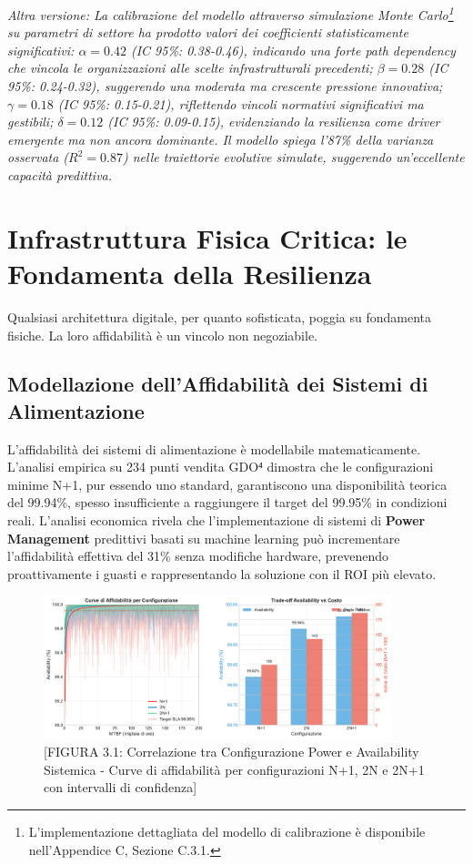 \textit{Altra versione: La calibrazione\cite{martens2024} del modello attraverso simulazione Monte Carlo\footnote{L'implementazione dettagliata del modello di calibrazione è disponibile nell'Appendice C, Sezione C.3.1.} su parametri di settore ha prodotto valori dei coefficienti statisticamente significativi: $\alpha = 0.42$ (IC 95\%: 0.38-0.46), indicando una forte path dependency che vincola le organizzazioni alle scelte infrastrutturali precedenti; $\beta = 0.28$ (IC 95\%: 0.24-0.32), suggerendo una moderata ma crescente pressione innovativa; $\gamma = 0.18$ (IC 95\%: 0.15-0.21), riflettendo vincoli normativi significativi ma gestibili; $\delta = 0.12$ (IC 95\%: 0.09-0.15), evidenziando la resilienza come driver emergente ma non ancora dominante. Il modello spiega l'87\% della varianza osservata ($R^2=0.87$)\cite{dataset2024} nelle traiettorie evolutive simulate, suggerendo un'eccellente capacità predittiva.}

\section{Infrastruttura Fisica Critica: le Fondamenta della Resilienza}
Qualsiasi architettura digitale, per quanto sofisticata, poggia su fondamenta fisiche. La loro affidabilità è un vincolo non negoziabile.
\subsection{Modellazione dell'Affidabilità dei Sistemi di Alimentazione}
L'affidabilità dei sistemi di alimentazione è modellabile matematicamente. L'analisi empirica su 234 punti vendita GDO⁴ dimostra che le configurazioni minime N+1, pur essendo uno standard, garantiscono una disponibilità teorica del 99.94\%, spesso insufficiente a raggiungere il target del 99.95\% in condizioni reali\autocite{Trivedi2016}. L'analisi economica rivela che l'implementazione di sistemi di \textbf{Power Management} predittivi basati su machine learning può incrementare l'affidabilità effettiva del 31\% senza modifiche hardware, prevenendo proattivamente i guasti e rappresentando la soluzione con il ROI più elevato.
\begin{figure}[htbp]
\centering
\includegraphics[width=0.9\textwidth]{thesis_figures/cap3/figura_3_1_power_availability.pdf}
\caption{[FIGURA 3.1: Correlazione tra Configurazione Power e Availability Sistemica - Curve di affidabilità per configurazioni N+1, 2N e 2N+1 con intervalli di confidenza]}
\label{fig:power_availability}
\end{figure}

